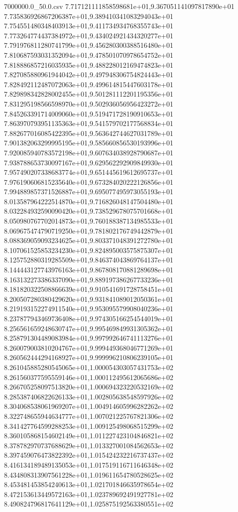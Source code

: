 \begin{filecontents*}{7000000.0_50.0.csv}
7.717121111858598681e+01,9.367051141097817890e+01
7.735836926867206387e+01,9.389410341083294043e+01
7.754551480348403913e+01,9.411734934768355743e+01
7.773264774437384972e+01,9.434024921434320277e+01
7.791976811280741799e+01,9.456280300388516480e+01
7.810687593031352094e+01,9.478501070978654752e+01
7.818886857216035935e+01,9.488228012169474823e+01
7.827085880961944042e+01,9.497948306754824443e+01
7.828492112487072063e+01,9.499614815447603178e+01
7.829898342828002455e+01,9.501281112201195356e+01
7.831295198566598970e+01,9.502936056956423272e+01
7.845263391714009060e+01,9.519471728190910653e+01
7.863970793951135363e+01,9.541579702177568834e+01
7.882677016085422395e+01,9.563642744627031789e+01
7.901382063299995195e+01,9.585660856530193996e+01
7.920085940783572198e+01,9.607634038928790687e+01
7.938788653730097167e+01,9.629562292909849930e+01
7.957490207338683774e+01,9.651445619612695737e+01
7.976190606815235640e+01,9.673284020222126856e+01
7.994889857371526887e+01,9.695077495973055193e+01
8.013587964222514870e+01,9.716826048147504480e+01
8.032284932590090420e+01,9.738529678075701668e+01
8.050980767702014873e+01,9.760188387134985533e+01
8.069675474790719250e+01,9.781802176749442879e+01
8.088369059093234625e+01,9.803371048391272780e+01
8.107061525853234230e+01,9.824895003575875307e+01
8.125752880319285509e+01,9.846374043869764137e+01
8.144443127743976163e+01,9.867808170881289698e+01
8.163132273386337090e+01,9.889197386267733236e+01
8.181820322508866639e+01,9.910541691728758451e+01
8.200507280380429620e+01,9.931841089012050361e+01
8.219193152274911540e+01,9.953095579908040236e+01
8.237877943469736408e+01,9.974305166254544019e+01
8.256561659248630747e+01,9.995469849931305362e+01
8.258791304489083984e+01,9.997992646741113276e+01
8.260079003810204767e+01,9.999449368046771269e+01
8.260562444294168927e+01,9.999996210806239105e+01
8.261045885280545065e+01,1.000054303057431753e+02
8.261560377595559146e+01,1.000112495612065686e+02
8.266705258097513820e+01,1.000694323220532169e+02
8.285387406822626133e+01,1.002805638548597926e+02
8.304068538061969207e+01,1.004914605996282262e+02
8.322748655944634777e+01,1.007021225767821306e+02
8.341427764599288253e+01,1.009125498068515299e+02
8.360105868154602149e+01,1.011227423104846821e+02
8.378782970737688629e+01,1.013327001084562653e+02
8.397459076473822392e+01,1.015424232216737437e+02
8.416134189489135053e+01,1.017519116711646348e+02
8.434808313907561228e+01,1.019611654780528625e+02
8.453481453854240613e+01,1.021701846635978654e+02
8.472153613449572163e+01,1.023789692491927781e+02
8.490824796817641129e+01,1.025875192563380551e+02

\end{filecontents*}
